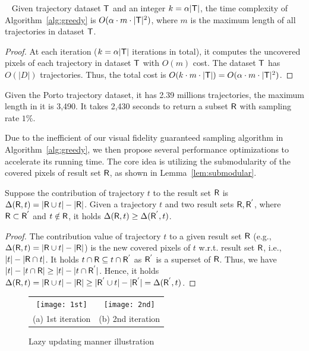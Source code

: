 \begin{lemma}~\label{lem:cost}
Given trajectory dataset $\mathsf{T}$ and an integer $k = \alpha |\mathsf{T}|$, the time complexity of Algorithm~\ref{alg:greedy} is $O(\alpha \cdot m \cdot |\mathsf{T}|^2)$, where $m$ is the maximum length of all trajectories in dataset $\mathsf{T}$.
\end{lemma}

\begin{proof}
At each iteration ($k = \alpha |\mathsf{T}|$ iterations in total),
it computes the uncovered pixels of each trajectory in dataset $\mathsf{T}$ with $O(m)$ cost.
The dataset $\mathsf{T}$ has $O(|D|)$ trajectories.
Thus, the total cost is $O(k \cdot m \cdot |\mathsf{T}|)=O(\alpha \cdot m \cdot |\mathsf{T}|^2)$.
\end{proof}

 Given the Porto trajectory dataset, it has 2.39 millions trajectories, the maximum length in it is 3,490.
It takes 2,430 seconds to return a subset $\mathsf{R}$ with sampling rate $1\%$.

Due to the inefficient of our visual fidelity guaranteed sampling algorithm in Algorithm~\ref{alg:greedy},
we then propose several performance optimizations  to accelerate its running time.
The core idea is utilizing the submodularity of the covered pixels of result set $\mathsf{R}$, as shown in Lemma~\ref{lem:submodular}.

\begin{lemma}[Submodularity]\label{lem:submodular}
Suppose the contribution of trajectory $t$ to the result set $\mathsf{R}$ is $\Delta(\mathsf{R}, t) = |\mathsf{R} \cup t| - |\mathsf{R}|$.
Given a trajectory $t$ and two result sets $\mathsf{R},\mathsf{R}^{'}$, where $\mathsf{R} \subset \mathsf{R}^{'}$ and $t \notin \mathsf{R}$,
it holds $ \Delta(\mathsf{R}, t) \geq \Delta(\mathsf{R}^{'}, t)$.
\end{lemma}

\begin{proof}
The contribution value of trajectory $t$ to a given result set $\mathsf{R}$ (e.g., $\Delta(\mathsf{R}, t) = |\mathsf{R} \cup t| - |\mathsf{R}|$) is the new covered pixels of $t$ w.r.t. result set $\mathsf{R}$, i.e., $|t| - |\mathsf{R} \cap t|$.
It holds $t \cap \mathsf{R} \subseteq  t \cap \mathsf{R}^{'}$ as $\mathsf{R}^{'}$ is a superset of $\mathsf{R}$.
Thus, we have $|t| - |t \cap \mathsf{R}| \geq |t| - |t \cap \mathsf{R}^{'}|$.
Hence, it holds $\Delta(\mathsf{R}, t) = |\mathsf{R} \cup t| - |\mathsf{R}| \geq |\mathsf{R}^{'} \cup t| - |\mathsf{R}^{'}|= \Delta(\mathsf{R}^{'}, t)$.
\end{proof}

\begin{figure}
 \centering
 \small
 \begin{tabular}{cc}
   \texttt{[image: 1st]}
   &
   \texttt{[image: 2nd]}
   \\
   (a) 1st iteration
   &
   (b) 2nd iteration
 \end{tabular}
 \caption{Lazy updating manner illustration}
 \label{fig:heap}
\end{figure}


